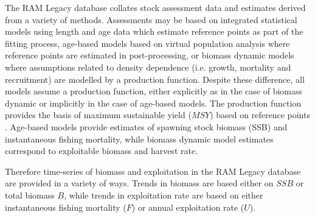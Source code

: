 The RAM Legacy database collates stock assessment data and estimates derived from a variety of methods. Assessments may be based on integrated statistical models using length and age data which %
estimate reference points as part of the fitting process, age-based models based on  virtual population analysis where reference points are estimated in post-processing, or biomass dynamic models where assumptions related to density dependence (i.e. growth, mortality and recruitment) are modelled by a production function. Despite these difference, all models assume a production function, either explicitly as in the case of biomass dynamic or implicitly in the case of age-based models. The production function provides the basis of maximum sustainable yield ($MSY$) based on reference points \citep{sissenwine1987alternative}. Age-based models provide estimates of spawning stock biomass (SSB) and instantaneous fishing mortality, while biomass dynamic model estimates correspond to exploitable biomass and harvest rate.

Therefore time-series of biomass and exploitation in the RAM Legacy database are provided in a variety of ways. Trends in biomass are based either on $SSB$ or total biomass $B$, while trends in exploitation rate are based on either instantaneous fishing mortality ($F$) or annual exploitation rate ($U$). %

\iffalse
This can introduce bias when using them to evaluate the performance of assessment methods. Therefore we undertook a hierarchical approach based on the quantities available by stock; namely, the number in brackets gives the number of cases 

\begin{itemize}
 \item total biomass, exploitation rate and $MSY$ reference points (5)
 \item total biomass, instantaneous fishing mortality and $MSY$ reference points (37)
 \item spawning stock biomass, instantaneous fishing mortality and $MSY$ reference points (67)
\end{itemize}
\fi

